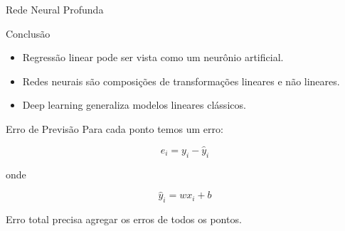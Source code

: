 \documentclass{beamer}
\begin{document}
    
    \begin{frame}{Rede Neural Profunda}
        
        \centering
        
        
    \end{frame}
    
    
    \begin{frame}{Conclusão}
        
        \begin{itemize}
            
            \item Regressão linear pode ser vista como um neurônio artificial.
            
            \item Redes neurais são composições de transformações lineares e não lineares.
            
            \item Deep learning generaliza modelos lineares clássicos.
            
        \end{itemize}
        
    \end{frame}
   
\begin{frame}{Erro de Previsão}
    Para cada ponto temos um erro:
    
    \[
    e_i = y_i - \hat{y}_i
    \]
    
    onde
    
    \[
    \hat{y}_i = wx_i + b
    \]
    
    Erro total precisa agregar os erros de todos os pontos.
\end{frame}
\end{document}
